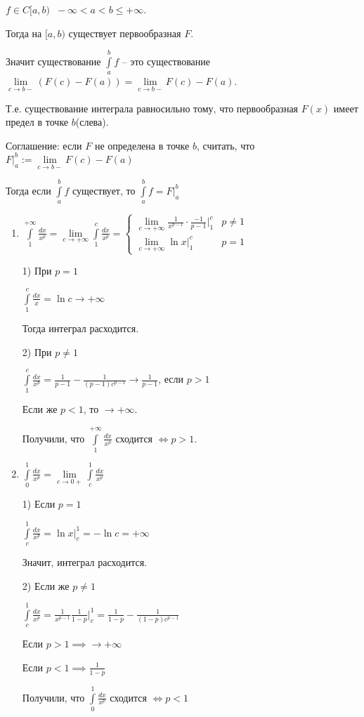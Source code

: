 \begin{remark}\slashns
	
	$f \in C[a,b) \;\; -\infty < a < b \le +\infty$.
	
	Тогда на $[a,b)$ существует первообразная $F$.
	
	Значит существование $\int\limits_a^b f$ -- это существование $\lim\limits_{c \to b-} (F(c) - F(a)) = \lim\limits_{c \to b-} F(c) - F(a)$.
	
	Т.е. существование интеграла равносильно тому, что первообразная $F(x)$ имеет предел в точке $b$(слева).
	
	Соглашение: если $F$ не определена в точке $b$, считать, что $F \Big|_a^b := \lim\limits_{c\to b-} F(c) - F(a)$
	
	Тогда если $\int\limits_a^b f$ существует, то $\int\limits_a^b f = F\Big|_a^b$
	
\end{remark}

\begin{example}\slashns
	
	\begin{enumerate}
		\item
		$\int\limits_1^{+\infty} \frac{dx}{x^p} = \lim\limits_{c \to +\infty} \int\limits_1^c \frac{dx}{x^p} = \begin{cases}\lim\limits_{c \to +\infty} \frac1{x^{p-1}} \cdot \frac{-1}{p-1} \Big|_1^c & p \ne 1 \\ 
		\lim\limits_{c \to +\infty} \ln x \Big|_1^c & p = 1\end{cases}$
		
		1) При $p=1$
		
		$\int\limits_1^c \frac{dx}{x} = \ln c \to +\infty$
		
		Тогда интеграл расходится.
		
		2) При $p \ne 1$
		
		$\int\limits_1^c \frac{dx}{x^p} = \frac1{p-1} - \frac1{(p-1)c^{p-1}} \to \frac1{p-1}$, если $p>1$
		
		Если же $p < 1$, то $\to +\infty$.
		
		Получили, что $\int\limits_1^{+\infty} \frac{dx}{x^p}$ сходится $\iff p > 1$.
		
		\item 
		$\int\limits_0^{1} \frac{dx}{x^p} = \lim\limits_{c \to 0+} \int\limits_c^1 \frac{dx}{x^p}$
		
		1) Если $p = 1$
		
		$\int\limits_c^1 \frac{dx}{x^p} = \ln x \Big|_c^1 = -\ln c = +\infty$
		
		Значит, интеграл расходится.
		
		2) Если же $p \ne 1$
		
		$\int\limits_c^1 \frac{dx}{x^p} = \frac1{x^{p-1}} \frac{1}{1-p}\Big|_c^1 = \frac1{1-p} - \frac1{(1-p)c^{p-1}}$
		
		Если $p > 1 \implies \to + \infty$
		
		Если $p < 1 \implies \frac1{1-p}$
		
		Получили, что $\int\limits_0^{1} \frac{dx}{x^p}$ сходится $\iff p < 1$
	\end{enumerate}
\end{example}
